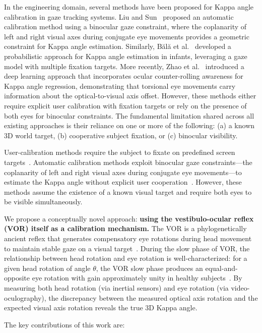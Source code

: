 \documentclass[review,numbers,sort&compress]{elsarticle}
\begin{document}
In the engineering domain, several methods have been proposed for Kappa angle calibration in gaze tracking systems. Liu and Sun~\cite{Liu2023} proposed an automatic calibration method using a binocular gaze constraint, where the coplanarity of left and right visual axes during conjugate eye movements provides a geometric constraint for Kappa angle estimation. Similarly, B\u{a}l\u{a} et al.~\cite{Bala2012} developed a probabilistic approach for Kappa angle estimation in infants, leveraging a gaze model with multiple fixation targets. More recently, Zhao et al.~\cite{CVPRW2023} introduced a deep learning approach that incorporates ocular counter-rolling awareness for Kappa angle regression, demonstrating that torsional eye movements carry information about the optical-to-visual axis offset. However, these methods either require explicit user calibration with fixation targets or rely on the presence of both eyes for binocular constraints. The fundamental limitation shared across all existing approaches is their reliance on one or more of the following: (a) a known 3D world target, (b) cooperative subject fixation, or (c) binocular visibility.

User-calibration methods require the subject to fixate on predefined screen targets~\cite{Liu2023}. Automatic calibration methods exploit binocular gaze constraints---the coplanarity of left and right visual axes during conjugate eye movements---to estimate the Kappa angle without explicit user cooperation~\cite{Liu2023}. However, these methods assume the existence of a known visual target and require both eyes to be visible simultaneously.

We propose a conceptually novel approach: \textbf{using the vestibulo-ocular reflex (VOR) itself as a calibration mechanism.} The VOR is a phylogenetically ancient reflex that generates compensatory eye rotations during head movement to maintain stable gaze on a visual target~\cite{Raphan1979,Cohen1981}. During the slow phase of VOR, the relationship between head rotation and eye rotation is well-characterized: for a given head rotation of angle $\theta$, the VOR slow phase produces an equal-and-opposite eye rotation with gain approximately unity in healthy subjects~\cite{Halmagyi2021,MacDougall2009,Moore2011}. By measuring both head rotation (via inertial sensors) and eye rotation (via video-oculography), the discrepancy between the measured optical axis rotation and the expected visual axis rotation reveals the true 3D Kappa angle.

The key contributions of this work are:
\end{document}
